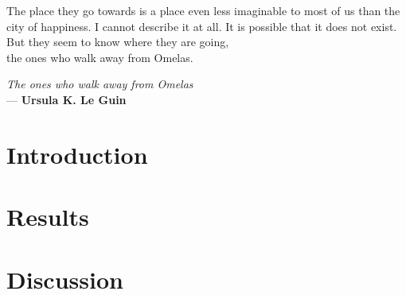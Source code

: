 



\frontmatter {}  %
    
    \epigraph{The place they go towards is a place even less imaginable to most of us than the city of happiness. I cannot describe it at all. It is possible that it does not exist. \\ But they seem to know where they are going, \\ the ones who walk away from Omelas.}{\textit{The ones who walk away from Omelas} \\ --- \textbf{Ursula K. Le Guin}}
    
    
    
     \tableofcontents {}

\mainmatter
    \part{Introduction}\label{introduction}
        
        
    \part{Results}\label{results}
        
        
        
    \part{Discussion}\label{discussion}
        
        

\backmatter
    \listoffigures
    
    
    



